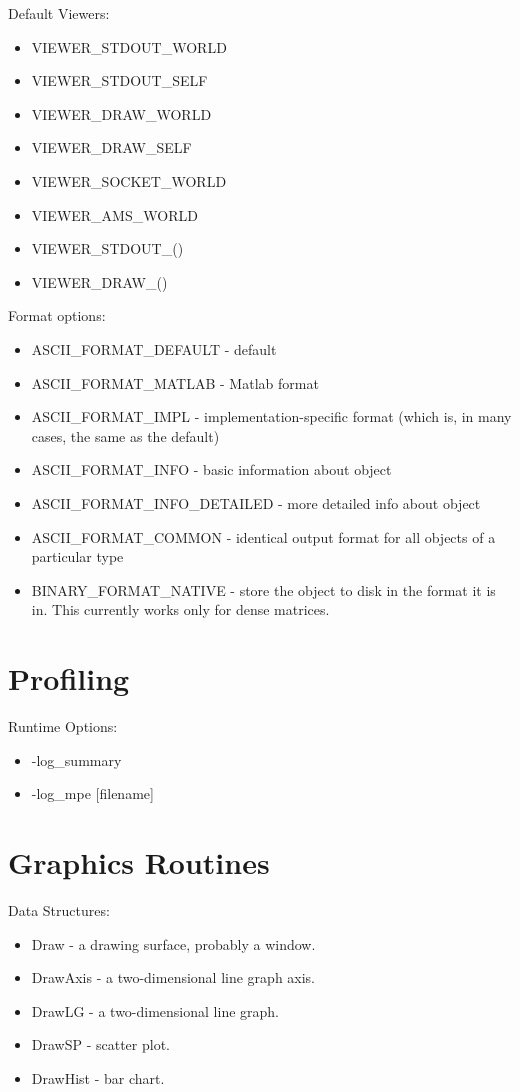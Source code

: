 {\noindent
Default Viewers:
\begin{itemize}
\item VIEWER\_STDOUT\_WORLD
\item VIEWER\_STDOUT\_SELF
\item VIEWER\_DRAW\_WORLD
\item VIEWER\_DRAW\_SELF
\item VIEWER\_SOCKET\_WORLD
\item VIEWER\_AMS\_WORLD
\item VIEWER\_STDOUT\_()
\item VIEWER\_DRAW\_()
\end{itemize}
Format options:
\begin{itemize}
\item ASCII\_FORMAT\_DEFAULT - default
\item ASCII\_FORMAT\_MATLAB - Matlab format
\item  ASCII\_FORMAT\_IMPL - implementation-specific format
      (which is, in many cases, the same as the default)
\item ASCII\_FORMAT\_INFO - basic information about object
\item ASCII\_FORMAT\_INFO\_DETAILED - more detailed info about object
\item ASCII\_FORMAT\_COMMON - identical output format for
       all objects of a particular type
\item BINARY\_FORMAT\_NATIVE - store the object to disk in the format it
      is in. This currently works only for dense matrices.
\end{itemize}

{\footnotesize
\noindent

}

\section{Profiling}
Runtime Options:
\begin{itemize}
\item -log\_summary
\item -log\_mpe [filename]
\end{itemize}

{\footnotesize
\noindent

}

\section{Graphics Routines}

\noindent
Data Structures:
\begin{itemize}
\item Draw - a drawing surface, probably a window.
\item DrawAxis - a two-dimensional line graph axis.
\item DrawLG - a two-dimensional line graph.
\item DrawSP - scatter plot.
\item DrawHist - bar chart.
\end{itemize}


{\footnotesize
\noindent

}
}
